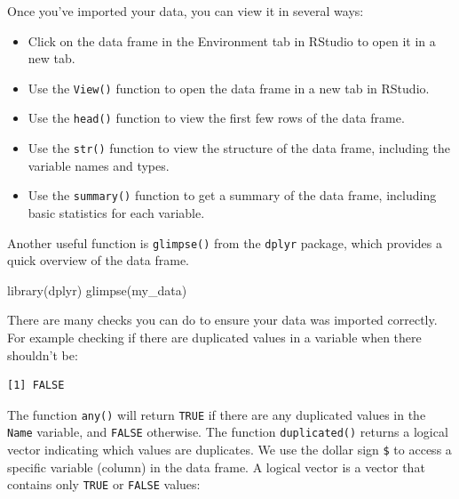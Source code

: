 \documentclass[
  letterpaper,
  8pt,
  a4paper]{book}
\newenvironment{Shaded}{\begin{snugshade}}{\end{snugshade}}
\newcommand{\FunctionTok}[1]{\textcolor[rgb]{0.28,0.35,0.67}{#1}}
\newcommand{\NormalTok}[1]{\textcolor[rgb]{0.00,0.23,0.31}{#1}}
\newcommand{\SpecialCharTok}[1]{\textcolor[rgb]{0.37,0.37,0.37}{#1}}
\providecommand{\tightlist}{%
  \setlength{\itemsep}{0pt}\setlength{\parskip}{0pt}}
\begin{document}

Once you've imported your data, you can view it in several ways:

\begin{itemize}
\tightlist
\item
  Click on the data frame in the Environment tab in RStudio to open it
  in a new tab.
\item
  Use the \texttt{View()} function to open the data frame in a new tab
  in RStudio.
\item
  Use the \texttt{head()} function to view the first few rows of the
  data frame.
\item
  Use the \texttt{str()} function to view the structure of the data
  frame, including the variable names and types.
\item
  Use the \texttt{summary()} function to get a summary of the data
  frame, including basic statistics for each variable.
\end{itemize}

Another useful function is \texttt{glimpse()} from the \texttt{dplyr}
package, which provides a quick overview of the data frame.

\begin{Shaded}
\begin{Highlighting}[]
\FunctionTok{library}\NormalTok{(dplyr)}
\FunctionTok{glimpse}\NormalTok{(my\_data)}
\end{Highlighting}
\end{Shaded}

There are many checks you can do to ensure your data was imported
correctly. For example checking if there are duplicated values in a
variable when there shouldn't be:

\begin{Shaded}
\end{Shaded}

\begin{verbatim}
[1] FALSE
\end{verbatim}

The function \texttt{any()} will return \texttt{TRUE} if there are any
duplicated values in the \texttt{Name} variable, and \texttt{FALSE}
otherwise. The function \texttt{duplicated()} returns a logical vector
indicating which values are duplicates. We use the dollar sign
\texttt{\$} to access a specific variable (column) in the data frame. A
logical vector is a vector that contains only \texttt{TRUE} or
\texttt{FALSE} values:
\end{document}
